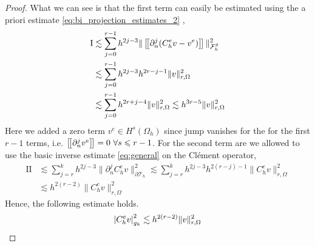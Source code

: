 \begin{proof}
    What we can see is that the first term can easily be estimated using the a priori estimate \eqref{eq:bi_projection_estimates_2} ,
    \begin{equation}
        \begin{split}
        \mathrm{I}  & \lesssim \sum_{j=0}^{r-1} h^{2j-3}   \| \left[\!\left[  \partial ^{j}_{n}  ( C^{e}_{h} v - v^{e})    \right]\!\right]  \|_{\mathcal{F}_{h}^{g} }^{2} \\
        & \lesssim \sum_{j=0}^{r-1} h^{2j-3}  h^{2r - j - 1}\| v  \|_{r,\Omega  }^{2} \\
        & \lesssim \sum_{j=0}^{r-1}  h^{2r + j - 4}\| v  \|_{r,\Omega  }^{2} \lesssim   h^{3r - 5}\| v  \|_{r,\Omega  }^{2}
        \end{split}
    \end{equation}
    Here we added a zero term $v^{e} \in H^{s}( \Omega_{h} ) $  since jump vanishes for the for the first $r-1$ terms, i.e. $\left[\!\left[  \partial ^{j}_{n} v^{e}  \right]\!\right] = 0  \  \forall s \leqslant r-1$. For the second term are we allowed to use the basic inverse
    estimate \eqref{eq:general} on the Clément operator,
    \begin{equation}
        \begin{split}
       \mathrm{II}  & \lesssim \sum_{j=r}^{k} h^{2j-3}  \|  \partial ^{j}_{n} C^{e}_{h} v \|_{\partial \mathcal{T}_{h} }^{2} \lesssim \sum_{j=r}^{k} h^{2j-3} h^{2( r - j ) - 1}  \|  C^{e}_{h} v \|_{ r,\Omega  }^{2}  \\
       &  \lesssim h^{2( r-2) } \| C^{e}_{h}v \|_{r,\Omega}^{2}
        \end{split}
    \end{equation}
    Hence, the following estimate holds.
    \begin{equation}
        \left\lvert  C^{e}_{h} v  \right\rvert_{g_{h}}^{2} \lesssim h^{2( r -2 )}\| v \|_{r, \Omega   }^{2}
    \end{equation}

\end{proof}
